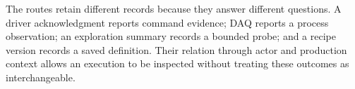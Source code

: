 The routes retain different records because they answer different
questions. A driver acknowledgment reports command evidence; DAQ reports a
process observation; an exploration summary records a bounded probe; and a
recipe version records a saved definition. Their relation through actor and
production context allows an execution to be inspected without treating
these outcomes as interchangeable.


